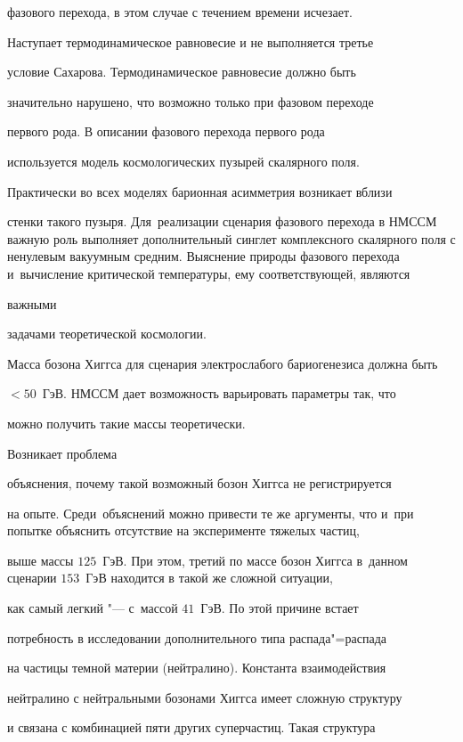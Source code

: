 фазового перехода, в этом случае с течением времени исчезает.

Наступает термодинамическое равновесие и не выполняется третье

условие Сахарова. Термодинамическое равновесие должно быть

значительно нарушено, что возможно только при фазовом переходе

первого рода. В описании фазового перехода первого рода

используется модель космологических пузырей скалярного поля.

Практически во всех моделях барионная асимметрия возникает вблизи

стенки такого пузыря. Для~реализации сценария фазового перехода в НМССМ важную роль выполняет дополнительный синглет комплексного скалярного поля с ненулевым вакуумным средним. Выяснение природы фазового перехода и~вычисление критической температуры, ему соответствующей, являются


важными


задачами теоретической космологии.



Масса бозона Хиггса для сценария электрослабого бариогенезиса должна быть

$<50$~ГэВ. НМССМ дает возможность варьировать параметры так, что

можно получить такие массы теоретически. 


Возникает проблема

объяснения, почему такой возможный бозон Хиггса не регистрируется

на опыте. Среди~объяснений можно привести те же аргументы, что и~при попытке объяснить отсутствие на эксперименте тяжелых частиц,

выше массы $125$~ГэВ. При этом, третий по массе бозон Хиггса в~данном сценарии $153$~ГэВ находится в такой же сложной ситуации,

как самый легкий "--- с~массой $41$~ГэВ. По этой причине встает

потребность в исследовании дополнительного типа распада"=распада

на частицы темной материи (нейтралино). Константа взаимодействия

нейтралино с нейтральными бозонами Хиггса имеет сложную структуру

и связана с комбинацией пяти других суперчастиц. Такая структура

